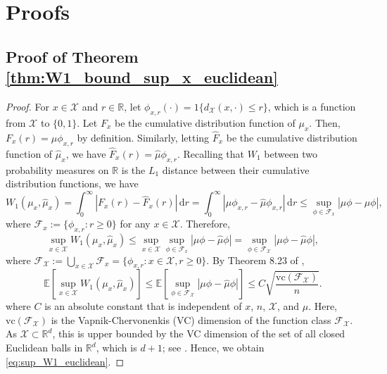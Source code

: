 \documentclass[11pt,letterpaper]{article}
\theoremstyle{definition}
\numberwithin{equation}{section}
\newcommand{\cF}{\mathcal{F}}
\newcommand{\cX}{\mathcal{X}}
\newcommand{\R}{\mathbb{R}}
\newcommand{\E}{\mathbb{E}} %
\begin{document}
\appendix
\section{Proofs}
\label{sec:proofs}

\subsection{Proof of Theorem \ref{thm:W1_bound_sup_x_euclidean}}
\begin{proof}
    For $x \in \cX$ and $r \in \R$, let $\phi_{x, r}(\cdot) = 1\{d_\cX(x, \cdot) \le r\}$, which is a function from $\cX$ to $\{0, 1\}$. Let $F_x$ be the cumulative distribution function of $\mu_x$. Then, $F_x(r) = \mu \phi_{x, r}$ by definition. Similarly, letting $\hat{F}_x$ be the cumulative distribution function of $\hat{\mu}_x$, we have $\hat{F}_x(r) = \hat{\mu} \phi_{x, r}$. Recalling that $W_1$ between two probability measures on $\R$ is the $L_1$ distance between their cumulative distribution functions, we have
    \begin{equation*}
        W_1(\mu_x, \hat{\mu}_x) = \int_{0}^{\infty} |F_x(r) - \hat{F}_x(r)| \, \mathrm{d} r = \int_{0}^{\infty} |\mu \phi_{x, r} - \hat{\mu} \phi_{x, r}| \, \mathrm{d} r \le \sup_{\phi \in \cF_x} |\mu \phi - \hat{\mu} \phi|,
    \end{equation*}
    where $\cF_x := \{\phi_{x, r} : r \ge 0\}$ for any $x \in \cX$. Therefore,
    \begin{equation*}
        \sup_{x \in \cX} W_1(\mu_x, \hat{\mu}_x) \le \sup_{x \in \cX} \sup_{\phi \in \cF_x} |\mu \phi - \hat{\mu} \phi| = \sup_{\phi \in \cF_\cX} |\mu \phi - \hat{\mu} \phi|,
    \end{equation*}
    where $\cF_\cX := \bigcup_{x \in \cX} \cF_x = \{\phi_{x, r} : x \in \cX, r \ge 0\}$. By Theorem 8.23 of \cite{vershynin_2018}, 
    \begin{equation}
        \label{eq:sup_W1_VC_upper_bound}
        \E\left[\sup_{x \in \cX} W_1(\mu_x, \hat{\mu}_x)\right] \le \E\left[\sup_{\phi \in \cF_\cX} |\mu \phi - \hat{\mu} \phi|\right] \le C \sqrt{\frac{\mathrm{vc}(\cF_\cX)}{n}}.
    \end{equation}
    where $C$ is an absolute constant that is independent of $x$, $n$, $\cX$, and $\mu$. Here, $\mathrm{vc}(\cF_\cX)$ is the Vapnik-Chervonenkis (VC) dimension of the function class $\cF_\cX$. As $\cX \subset \R^d$, this is upper bounded by the VC dimension of the set of all closed Euclidean balls in $\R^d$, which is $d + 1$; see \cite{dudley1979balls}. Hence, we obtain \eqref{eq:sup_W1_euclidean}.
\end{proof}
\end{document}
